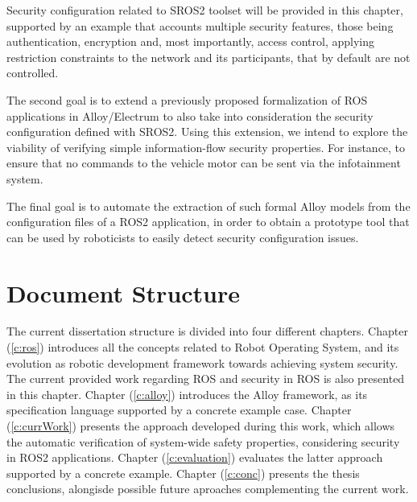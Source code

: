 Security configuration related to SROS2 toolset will be provided in this chapter, supported by an example that accounts multiple security features, those being authentication, encryption and, most importantly, access control, applying restriction constraints to the network and its participants, that by default are not controlled.

The second goal is to extend a previously proposed \cite{9341085} formalization of ROS applications in Alloy/Electrum \cite{alloy-6, lwspecification} to also take into consideration the security configuration defined with SROS2. Using this extension, we intend to explore the viability of verifying simple information-flow security properties. For instance, to ensure that no commands to the vehicle motor can be sent via the infotainment system.

The final goal is to automate the extraction of such formal Alloy models from the configuration files of a ROS2 application, in order to obtain a prototype tool that can be used by roboticists to easily detect security configuration issues.

\section{Document Structure}

The current dissertation structure is divided into four different chapters. Chapter (\ref{c:ros}) introduces all the concepts related to Robot Operating System, and its evolution as robotic development framework towards achieving system security. The current provided work regarding ROS and security in ROS is also presented in this chapter. Chapter (\ref{c:alloy}) introduces the Alloy framework, as its specification language supported by a concrete example case. Chapter (\ref{c:currWork}) presents the approach developed during this work, which allows
the automatic verification of system-wide safety properties, considering security in ROS2 applications. Chapter (\ref{c:evaluation}) evaluates the latter approach supported by a concrete example. Chapter (\ref{c:conc}) presents the thesis conclusions, alongisde possible future aproaches complementing the current work.